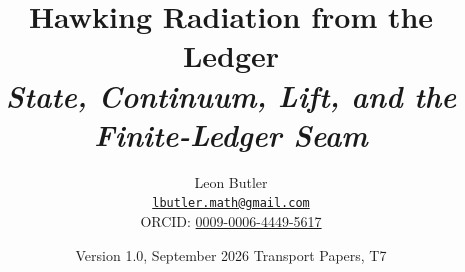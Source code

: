 \newtheorem{theorem}{Theorem}[section]
\newtheorem{proposition}[theorem]{Proposition}
\newtheorem{lemma}[theorem]{Lemma}
\newtheorem{corollary}[theorem]{Corollary}
\theoremstyle{definition}
\newtheorem{definition}[theorem]{Definition}
\newtheorem{remark}[theorem]{Remark}
\newtheorem{fact}[theorem]{Fact}
\newtheorem{assembly}[theorem]{Assembly}

\newcommand{\Cl}{\mathrm{Cl}}
\newcommand{\R}{\mathbb{R}}
\newcommand{\C}{\mathbb{C}}
\newcommand{\Z}{\mathbb{Z}}
\newcommand{\Mat}{\mathrm{M}}
\newcommand{\CAR}{\mathrm{CAR}}
\newcommand{\End}{\operatorname{End}}
\newcommand{\tr}{\operatorname{tr}}
\newcommand{\id}{\mathrm{id}}
\renewcommand{\TH}{T_{\mathrm{H}}} %
\newcommand{\ip}[2]{\langle #1, #2\rangle}
\newcommand{\T}{\mathbb{T}}

\title{\bfseries Hawking Radiation from the Ledger\\[4pt]
  \large\itshape State, Continuum, Lift, and the Finite-Ledger Seam}
\author{Leon Butler\\ \normalsize\href{mailto:lbutler.math@gmail.com}{\texttt{lbutler.math@gmail.com}}\\ \normalsize ORCID: \href{https://orcid.org/0009-0006-4449-5617}{0009-0006-4449-5617}}
\date{Version 1.0, September 2026 \textperiodcentered{} Transport Papers, T7}


\maketitle

